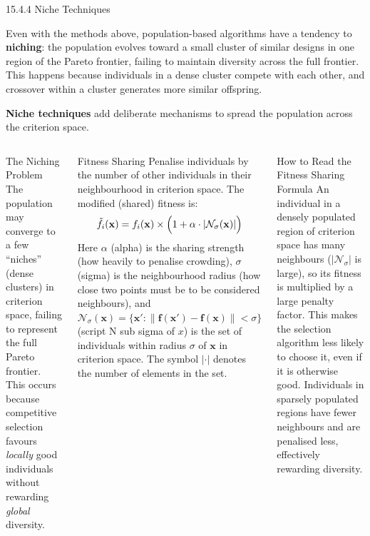 \documentclass[aspectratio=169,10pt]{beamer}
\newcommand{\bx}{\mathbf{x}}
\newcommand{\bff}{\mathbf{f}}
\begin{document}
\begin{frame}[allowframebreaks]{15.4.4 Niche Techniques}

Even with the methods above, population-based algorithms have a tendency to
\textbf{niching}: the population evolves toward a small cluster of similar
designs in one region of the Pareto frontier, failing to maintain diversity
across the full frontier.  This happens because individuals in a dense cluster
compete with each other, and crossover within a cluster generates more similar
offspring.

\textbf{Niche techniques} add deliberate mechanisms to spread the population
across the criterion space.

\begin{columns}
\begin{block}{The Niching Problem}
  The population may converge to a few ``niches'' (dense clusters) in
  criterion space, failing to represent the full Pareto frontier.  This
  occurs because competitive selection favours \emph{locally} good individuals
  without rewarding \emph{global} diversity.
\end{block}

\begin{block}{Fitness Sharing}
  Penalise individuals by the number of other individuals in their
  neighbourhood in criterion space.  The modified (shared) fitness is:
  \[
    \tilde{f}_i(\bx) = f_i(\bx) \times
    \Bigl(1 + \alpha \cdot |\mathcal{N}_\sigma(\bx)|\Bigr)
  \]
  Here $\alpha$ (alpha) is the sharing strength (how heavily to penalise
  crowding), $\sigma$ (sigma) is the neighbourhood radius (how close two
  points must be to be considered neighbours), and
  $\mathcal{N}_\sigma(\bx) = \{\bx' : \|\bff(\bx') - \bff(\bx)\| < \sigma\}$
  (script N sub sigma of $x$) is the set of individuals within radius
  $\sigma$ of $\bx$ in criterion space.  The symbol $|\cdot|$ denotes the
  number of elements in the set.
\end{block}

\begin{alertblock}{How to Read the Fitness Sharing Formula}
  An individual in a densely populated region of criterion space has many
  neighbours ($|\mathcal{N}_\sigma|$ is large), so its fitness is multiplied
  by a large penalty factor.  This makes the selection algorithm less likely
  to choose it, even if it is otherwise good.  Individuals in sparsely
  populated regions have fewer neighbours and are penalised less, effectively
  rewarding diversity.
\end{alertblock}


\end{columns}
\end{frame}
\end{document}
